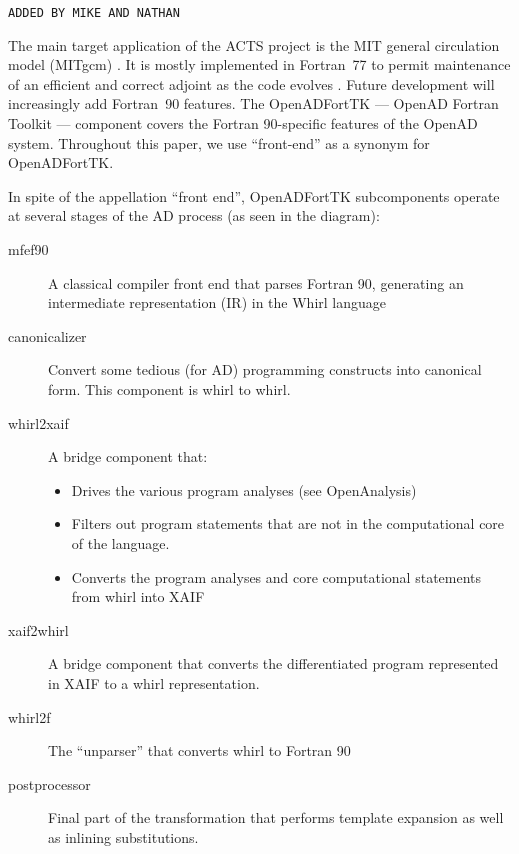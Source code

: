 \documentclass[acmtocl,acmnow]{acmtrans2m}
\begin{document}
{\tt ADDED BY MIKE AND NATHAN }

The main target application of the ACTS project is the MIT general
circulation model (MITgcm) \cite{mars-eta:97b,mars-eta:97a}.
It is mostly implemented in Fortran~77 to permit maintenance of an
efficient and correct adjoint as the code evolves \cite{HHG02}. Future
development will increasingly add Fortran~90 features.  The
OpenADFortTK --- OpenAD Fortran Toolkit --- component covers the
Fortran 90-specific features of the OpenAD system. Throughout this
paper, we use ``front-end'' as a synonym for OpenADFortTK.

In spite of the appellation ``front end'', OpenADFortTK subcomponents
operate at several stages of the AD process (as seen in the diagram):

   \begin{description}
     \item[mfef90] A classical compiler front end that parses
       Fortran 90, generating an intermediate representation (IR)
       in the Whirl language

     \item[canonicalizer] Convert some tedious (for AD) 
        programming constructs into canonical form. This component
        is whirl to whirl.

     \item[whirl2xaif] A bridge component that:
        \begin{itemize}
           \item Drives the various program analyses (see OpenAnalysis)
        
           \item Filters out program statements that are not in the
                 computational core of the language.

           \item Converts the program analyses and core computational
                 statements from whirl into XAIF
        \end{itemize}

     \item[xaif2whirl] A bridge component that converts the 
        differentiated program represented in XAIF
        to a whirl representation.

     \item[whirl2f] The ``unparser'' that converts whirl to
        Fortran 90

     \item[postprocessor] Final part of the transformation that
        performs template expansion as well as inlining substitutions.

   \end{description}
\end{document}
